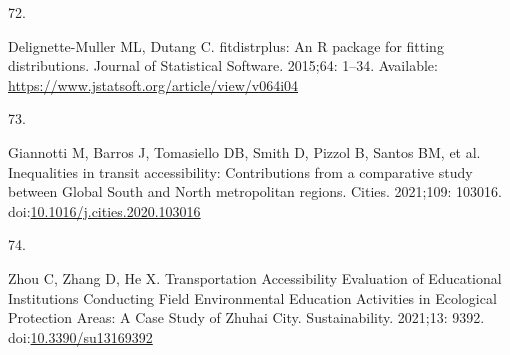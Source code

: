 \documentclass[10pt,letterpaper]{article}
\newlength{\cslhangindent}
\newlength{\csllabelwidth}
\newlength{\cslentryspacingunit} %
\newenvironment{CSLReferences}[2] %
 {%
  \setlength{\parindent}{0pt}
  \ifodd #1
  \let\oldpar\par
  \def\par{\hangindent=\cslhangindent\oldpar}
  \fi
  \setlength{\parskip}{#2\cslentryspacingunit}
 }%
 {}
\newcommand{\CSLLeftMargin}[1]{\parbox[t]{\csllabelwidth}{#1}}
\newcommand{\CSLRightInline}[1]{\parbox[t]{\linewidth - \csllabelwidth}{#1}\break}
\begin{document}
\begin{CSLReferences}{0}{0}
\leavevmode{}%
\CSLLeftMargin{72. }%
\CSLRightInline{Delignette-Muller ML, Dutang C. {fitdistrplus}: An {R}
package for fitting distributions. Journal of Statistical Software.
2015;64: 1--34. Available:
\url{https://www.jstatsoft.org/article/view/v064i04}}

\leavevmode{}%
\CSLLeftMargin{73. }%
\CSLRightInline{Giannotti M, Barros J, Tomasiello DB, Smith D, Pizzol B,
Santos BM, et al. Inequalities in transit accessibility: {Contributions}
from a comparative study between {Global} {South} and {North}
metropolitan regions. Cities. 2021;109: 103016.
doi:\href{https://doi.org/10.1016/j.cities.2020.103016}{10.1016/j.cities.2020.103016}}

\leavevmode{}%
\CSLLeftMargin{74. }%
\CSLRightInline{Zhou C, Zhang D, He X. Transportation {Accessibility
Evaluation} of {Educational Institutions Conducting Field Environmental
Education Activities} in {Ecological Protection Areas}: {A Case Study}
of {Zhuhai City}. Sustainability. 2021;13: 9392.
doi:\href{https://doi.org/10.3390/su13169392}{10.3390/su13169392}}

\end{CSLReferences}

\nolinenumbers
\end{document}
